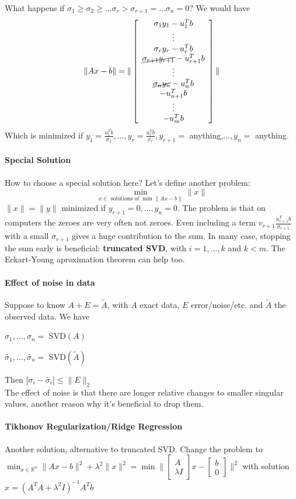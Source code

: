 \documentclass[10pt]{report}
\begin{document}
What happens if $\sigma_1\geq \sigma_2 \geq \ldots \sigma_r > \sigma_{r+1} = \ldots \sigma_n = 0$? We would have $$\|Ax-b\|=\|\left[\begin{array}{c}
\sigma_1y_1-u_1^Tb\\\vdots\\\sigma_ry_r-u_r^Tb\\\cancel{\sigma_{r+1}y_{r+1}}-u_{r+1}^Tb\\\vdots\\\cancel{\sigma_ny_n}-u_n^Tb\\-u_{n+1}^Tb\\\vdots\\-u_m^Tb
\end{array}\right]\|$$
Which is minimized if $y_1=\frac{u_1^Tb}{\sigma_1},\ldots,y_r=\frac{u_r^Tb}{\sigma_r},y_{r+1}=$ anything,$\ldots,y_n =$ anything.
\paragraph{Special Solution} How to choose a special solution here? Let's define another problem: $$\min_{x\in\text{ solutions of }\min\|Ax-b\|} \|x\|$$
$\|x\|=\|y\|$ minimized if $y_{r+1} = 0,\ldots,y_n = 0$. The problem is that on computers the zeroes are very often not zeroes. Even including a term $v_{r+1}\frac{u_{r+1}^Tb}{\sigma_{r+1}}$ with a small $\sigma_{r+1}$ gives a huge contribution to the sum. In many case, stopping the sum early is beneficial: \textbf{truncated SVD}, with $i=1,\ldots,k$ and $k<m$. The Eckart-Young aproximation theorem can help too.
\paragraph{Effect of noise in data} Suppose to know $A+E = \tilde{A}$, with $A$ exact data, $E$ error/noise/etc. and $\tilde{A}$ the observed data. We have
\begin{list}{}{}
	\item $\sigma_1,\ldots,\sigma_n =$ SVD$(A)$
	\item $\tilde{\sigma_1},\ldots,\tilde{\sigma_n} =$ SVD$(\tilde{A})$
\end{list}
Then $|\sigma_i - \tilde{\sigma_i}| \leq \|E\|_2$\\
The effect of noise is that there are longer relative changes to smaller singular values, another reason why it's beneficial to drop them.
\paragraph{Tikhonov Regularization/Ridge Regression} Another solution, alternative to truncated SVD. Change the problem to $\min_{x\in \mathbb{R}^n} \|Ax-b\|^2 + \lambda^2\|x\|^2 = \min\|\left[\begin{array}{c}
A\\\lambda I
\end{array}\right]x - \left[\begin{array}{c}
b\\0
\end{array}\right]\|^2$ with solution $x = (A^TA+\lambda^2 I)^{-1}A^Tb$
\end{document}
